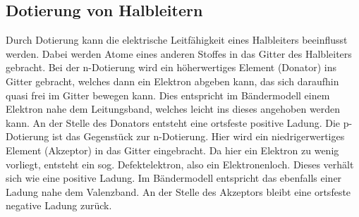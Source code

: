 \subsection{Dotierung von Halbleitern}
\label{subsec:dotierung}
Durch Dotierung kann die elektrische Leitfähigkeit eines Halbleiters beeinflusst werden.
Dabei werden Atome eines anderen Stoffes in das Gitter des Halbleiters gebracht.
Bei der n-Dotierung wird ein höherwertiges Element (Donator) ins Gitter gebracht, welches
dann ein Elektron abgeben kann, das sich daraufhin quasi frei im Gitter bewegen kann.
Dies entspricht im Bändermodell einem Elektron nahe dem Leitungsband, welches leicht
ins dieses angehoben werden kann. An der Stelle
des Donators entsteht eine ortsfeste positive Ladung.
Die p-Dotierung ist das Gegenstück zur n-Dotierung. Hier wird ein niedrigerwertiges
Element (Akzeptor) in das Gitter eingebracht. Da hier ein Elektron zu wenig vorliegt,
entsteht ein sog. Defektelektron, also ein Elektronenloch. Dieses verhält sich
wie eine positive Ladung. Im Bändermodell entspricht das ebenfalls einer Ladung
nahe dem Valenzband. An der Stelle
des Akzeptors bleibt eine ortsfeste negative Ladung zurück.

